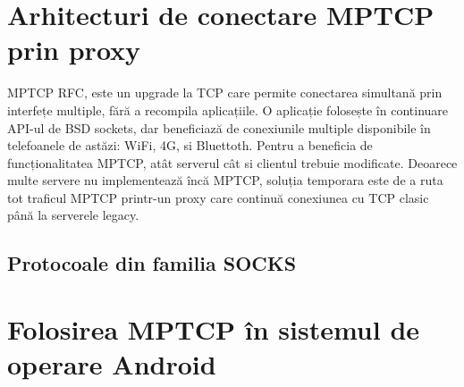 \chapter{Arhitecturi de conectare  MPTCP prin proxy}
\label{sec:arch_upb}

MPTCP RFC\cite{rfc6824bis}, \cite{mptcp-nsdi} este un upgrade la TCP
care permite conectarea simultană prin interfețe multiple, fără a
recompila aplicațiile. O aplicație folosește în continuare API-ul de
BSD sockets, dar beneficiază de conexiunile multiple disponibile în
telefoanele de astăzi: WiFi, 4G, si Bluettoth. Pentru a beneficia de
funcționalitatea MPTCP, atât serverul cât si clientul trebuie
modificate. Deoarece multe servere nu implementează încă MPTCP,
soluția temporara este de a ruta tot traficul MPTCP printr-un proxy
care continuă conexiunea cu TCP clasic până la serverele legacy.


\section{Protocoale din familia SOCKS}



\chapter{Folosirea MPTCP în sistemul de operare Android}
\label{sec:mptcp_android}



